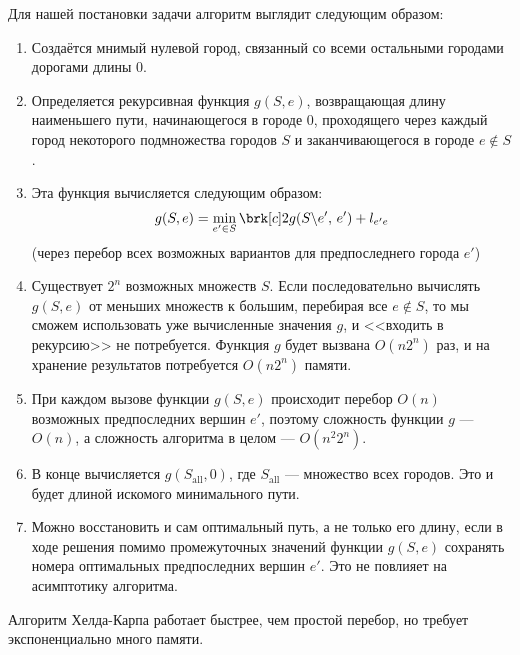 Для нашей постановки задачи алгоритм
выглядит следующим образом:

\begin{enumerate}

    \item Создаётся мнимый нулевой город, связанный со всеми остальными городами дорогами длины 0.
    
    \item Определяется рекурсивная функция $g(S, e)$, возвращающая длину наименьшего пути, начинающегося в городе 0, проходящего через каждый город некоторого подмножества городов $S$ и заканчивающегося в городе $e \notin S$. 
    
    \item Эта функция вычисляется следующим образом:
    \[
    g(S,e) = \min_{e' \in S} \brk[c]2{
        g(S\backslash e',\, e') + l_{e'e}
    }
    \]
    (через перебор всех возможных вариантов для предпоследнего города $e'$)

    \item Существует $2^n$ возможных множеств $S$. Если последовательно вычислять $g(S,e)$ от меньших множеств к большим, перебирая все $e \notin S$, то мы сможем использовать уже вычисленные значения $g$, и <<входить в рекурсию>> не потребуется. Функция $g$ будет вызвана $O(n2^n)$ раз, и на хранение результатов потребуется $O(n2^n)$ памяти.
    
    \item При каждом вызове функции $g(S,e)$ происходит перебор $O(n)$ возможных предпоследних вершин $e'$, поэтому сложность функции $g$ --- $O(n)$, а сложность алгоритма в целом --- $O(n^2 2^n)$.
    
    \item В конце вычисляется $g(S_{\text{all}}, 0)$, где $S_{\text{all}}$ --- множество всех городов. Это и будет длиной искомого минимального пути.
    
    \item Можно восстановить и сам оптимальный путь, а не только его длину, если в ходе решения помимо промежуточных значений функции $g(S,e)$ сохранять номера оптимальных предпоследних вершин $e'$. Это не повлияет на асимптотику алгоритма.

\end{enumerate}

Алгоритм Хелда-Карпа работает быстрее, чем простой перебор, но требует экспоненциально много памяти. %








